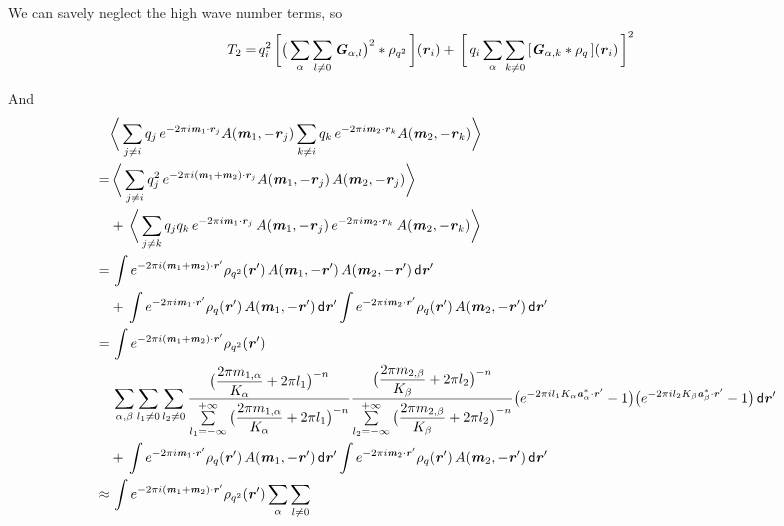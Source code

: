 \documentclass[aps,pre,preprint]{revtex4}
\renewcommand{\v}[1]{\textbf{\textit{#1}}}
\renewcommand{\d}[1]{\textsf{#1}}
\begin{document}
We can savely neglect the high wave number terms, so
\begin{align}
  T_2
  = &\,
  q_i^2\,
  \bigg[
  \big(
  \sum_{\alpha} \sum_{l\neq 0}  
  \v G_{\alpha,l}
  \big)^2
  \ast \rho_{q^2}\,
  \bigg] (\v r_i) + \,
  \bigg[\,
  q_i \sum_{\alpha}\sum_{k\neq 0}
  \,[\v G_{\alpha,k}\ast\rho_q\,] (\v r_i)
  \,\bigg]^2 
\end{align}

And 
\begin{align} \nonumber
  & \bigg\langle
  \sum_{j\neq i}q_j\,e^{-2\pi i\v m_1\cdot\v r_j}A(\v m_1, -\v r_j)
  \sum_{k\neq i}q_k\,e^{-2\pi i\v m_2\cdot\v r_k}A(\v m_2, -\v r_k)
  \bigg\rangle \\ \nonumber
  = &\,
  \bigg\langle
  \sum_{j\neq i}q^2_j\,e^{-2\pi i(\v m_1+\v m_2)\cdot\v r_j}A(\v m_1, -\v r_j)\,A(\v m_2, -\v r_j)
  \bigg\rangle \\ \nonumber
  &+ \,
  \bigg\langle
  \sum_{j\neq k}q_jq_k\,
  e^{-2\pi i\v m_1\cdot\v r_j}\,A(\v m_1, -\v r_j)\,
  e^{-2\pi i\v m_2\cdot\v r_k}\,A(\v m_2, -\v r_k)
  \bigg\rangle \\ \nonumber
  = &\,
  \int
  e^{-2\pi i (\v m_1 + \v m_2)\cdot\v r'}\rho_{q^2}(\v r')\,A(\v m_1,-\v r')\,A(\v m_2,-\v r')\,\d d\v r' \\\nonumber
  &+ \,
  \int
  e^{-2\pi i\v m_1\cdot\v r'}\rho_q(\v r')\,A(\v m_1,-\v r')\,\d d\v r'
  \int
  e^{-2\pi i\v m_2\cdot\v r'}\rho_q(\v r')\,A(\v m_2,-\v r') \,\d d\v r' \\\nonumber
  = &\,
  \int
  e^{-2\pi i (\v m_1 + \v m_2)\cdot\v r'}\rho_{q^2}(\v r') \\\nonumber
  &\,
  \sum_{\alpha, \beta}\sum_{l_1\neq 0}\sum_{l_2\neq 0}
  \frac
  {\big(\dfrac{2\pi m_{1,\alpha}}{K_\alpha} + 2\pi l_1\big)^{-n}}
  {\sum\limits_{l_1=-\infty}^{+\infty}
    \big(\dfrac{2\pi m_{1,\alpha}}{K_\alpha} + 2\pi l_1\big)^{-n}}
  \frac
  {\big(\dfrac{2\pi m_{2,\beta}}{K_\beta} + 2\pi l_2\big)^{-n}}
  {\sum\limits_{l_2=-\infty}^{+\infty}
    \big(\dfrac{2\pi m_{2,\beta}}{K_\beta} + 2\pi l_2\big)^{-n}}
  \big(
  e^{-2\pi i l_1 K_\alpha\v a^\ast_\alpha\cdot \v r'} - 1
  \big)
  \big(
  e^{-2\pi i l_2 K_\beta\v a^\ast_\beta\cdot \v r'} - 1
  \big)
  \,\d d\v r' \\\nonumber
  &+ \,
  \int
  e^{-2\pi i\v m_1\cdot\v r'}\rho_q(\v r')\,A(\v m_1,-\v r')\,\d d\v r'
  \int
  e^{-2\pi i\v m_2\cdot\v r'}\rho_q(\v r')\,A(\v m_2,-\v r') \,\d d\v r' \\\nonumber
  \approx &\,
  \int
  e^{-2\pi i (\v m_1 + \v m_2)\cdot\v r'}\rho_{q^2}(\v r') 
  \sum_{\alpha}\sum_{l\neq 0}

\end{align}
\end{document}

